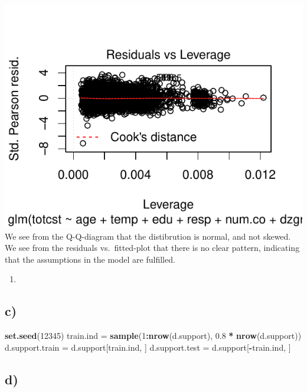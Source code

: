 \documentclass[
]{article}
\newenvironment{Shaded}{\begin{snugshade}}{\end{snugshade}}
\newcommand{\DecValTok}[1]{\textcolor[rgb]{0.00,0.00,0.81}{#1}}
\newcommand{\FloatTok}[1]{\textcolor[rgb]{0.00,0.00,0.81}{#1}}
\newcommand{\KeywordTok}[1]{\textcolor[rgb]{0.13,0.29,0.53}{\textbf{#1}}}
\newcommand{\NormalTok}[1]{#1}
\newcommand{\OperatorTok}[1]{\textcolor[rgb]{0.81,0.36,0.00}{\textbf{#1}}}
\newcommand{\StringTok}[1]{\textcolor[rgb]{0.31,0.60,0.02}{#1}}
\begin{document}
\includegraphics{Eksamensbesvarelse_files/figure-latex/unnamed-chunk-19-4.pdf}
We see from the Q-Q-diagram that the distibrution is normal, and not
skewed. We see from the residuals vs.~fitted-plot that there is no clear
pattern, indicating that the assumptions in the model are fulfilled.

\begin{enumerate}
\def\labelenumi{\roman{enumi})}
\setcounter{enumi}{2}
\item
\end{enumerate}

\hypertarget{c-1}{%
\subsection{c)}\label{c-1}}

\begin{Shaded}
\begin{Highlighting}[]
\KeywordTok{set.seed}\NormalTok{(}\DecValTok{12345}\NormalTok{)}
\NormalTok{train.ind =}\StringTok{ }\KeywordTok{sample}\NormalTok{(}\DecValTok{1}\OperatorTok{:}\KeywordTok{nrow}\NormalTok{(d.support), }\FloatTok{0.8} \OperatorTok{*}\StringTok{ }\KeywordTok{nrow}\NormalTok{(d.support))}
\NormalTok{d.support.train =}\StringTok{ }\NormalTok{d.support[train.ind, ]}
\NormalTok{d.support.test =}\StringTok{ }\NormalTok{d.support[}\OperatorTok{-}\NormalTok{train.ind, ]}
\end{Highlighting}
\end{Shaded}

\hypertarget{d-1}{%
\subsection{d)}\label{d-1}}
\end{document}
